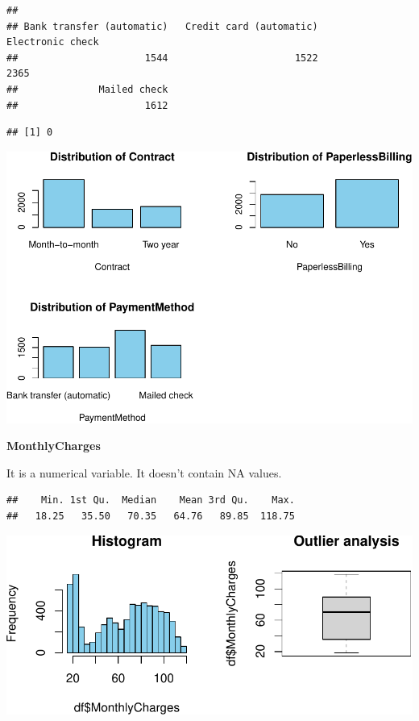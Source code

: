 \documentclass[
  twoside]{article}
\newenvironment{Shaded}{\begin{snugshade}}{\end{snugshade}}
\newcommand{\FunctionTok}[1]{\textcolor[rgb]{0.00,0.00,0.00}{#1}}
\newcommand{\NormalTok}[1]{#1}
\newcommand{\SpecialCharTok}[1]{\textcolor[rgb]{0.00,0.00,0.00}{#1}}
\begin{document}
\begin{verbatim}
## 
## Bank transfer (automatic)   Credit card (automatic)          Electronic check 
##                      1544                      1522                      2365 
##              Mailed check 
##                      1612
\end{verbatim}

\begin{Shaded}
\end{Shaded}

\begin{verbatim}
## [1] 0
\end{verbatim}

\includegraphics{Assigment2_files/figure-latex/unnamed-chunk-32-1.pdf}

\textbf{MonthlyCharges}

It is a numerical variable. It doesn't contain NA values.

\begin{verbatim}
##    Min. 1st Qu.  Median    Mean 3rd Qu.    Max. 
##   18.25   35.50   70.35   64.76   89.85  118.75
\end{verbatim}

\includegraphics{Assigment2_files/figure-latex/unnamed-chunk-33-1.pdf}
\end{document}
